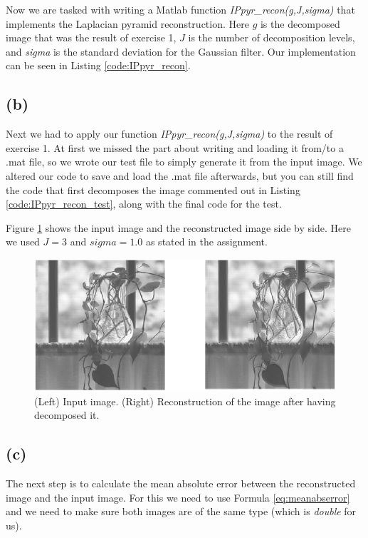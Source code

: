 \documentclass{article}
\begin{document}
Now we are tasked with writing a Matlab function \textit{IPpyr\_recon(g,J,sigma)} that implements the Laplacian pyramid reconstruction. Here $g$ is the decomposed image that was the result of exercise 1, $J$ is the number of decomposition levels, and \textit{sigma} is the standard deviation for the Gaussian filter. Our implementation can be seen in  Listing \ref{code:IPpyr_recon}.

\subsection*{(b)}
Next we had to apply our function \textit{IPpyr\_recon(g,J,sigma)} to the result of exercise 1. At first we missed the part about writing and loading it from/to a .mat file, so we wrote our test file to simply generate it from the input image. We altered our code to save and load the .mat file afterwards, but you can still find the code that first decomposes the image commented out in  Listing \ref{code:IPpyr_recon_test}, along with the final code for the test.

Figure \ref{fig:2b} shows the input image and the reconstructed image side by side. Here we used $J = 3$ and $sigma = 1.0$ as stated in the assignment.

\begin{figure}[h]
    \centering
    \includegraphics[width=\textwidth]{Assignment_3/output_plots/IPpyr_recon_test_partial.png}
    \caption{(Left) Input image. (Right) Reconstruction of the image after having decomposed it.}
    \label{fig:2b}
\end{figure}

\subsection*{(c)}
The next step is to calculate the mean absolute error between the reconstructed image and the input image. For this we need to use Formula \ref{eq:meanabserror} and we need to make sure both images are of the same type (which is \textit{double} for us).
\end{document}
